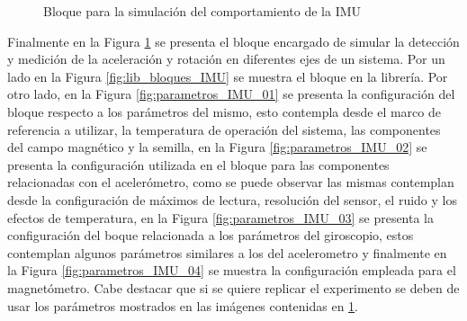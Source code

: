 \begin{figure}[htbp]
    \caption{Bloque para la simulación del comportamiento de la IMU}
    \label{fig:arreglo_imu}
\end{figure}


Finalmente en la Figura \ref{fig:arreglo_imu} se presenta el bloque encargado de simular la detección y medición de la aceleración y rotación en diferentes ejes de un sistema. Por un lado en la Figura \ref{fig:lib_bloques_IMU} se muestra el bloque en la librería. Por otro lado, en la Figura \ref{fig:parametros_IMU_01} se presenta la configuración del bloque respecto a los parámetros del mismo, esto contempla desde el marco de referencia a utilizar, la temperatura de operación del sistema, las componentes del campo magnético y la semilla, en la Figura \ref{fig:parametros_IMU_02} se presenta la configuración utilizada en el bloque para las componentes relacionadas con el acelerómetro, como se puede observar las mismas contemplan desde la configuración de máximos de lectura, resolución del sensor, el ruido y los efectos de temperatura, en la Figura \ref{fig:parametros_IMU_03} se presenta la configuración del boque relacionada a los parámetros del giroscopio, estos contemplan algunos parámetros similares a los del acelerometro y finalmente en la Figura \ref{fig:parametros_IMU_04} se muestra la configuración empleada para el magnetómetro. Cabe destacar que si se quiere replicar el experimento se deben de usar los parámetros mostrados en las imágenes contenidas en \ref{fig:arreglo_imu}. 




